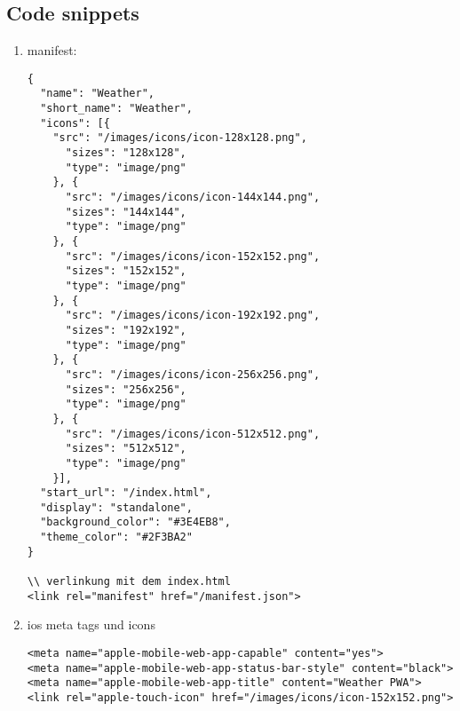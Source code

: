 \documentclass[oneside]{book}%
\begin{document}
\cleardoublepage
{}


\cleardoublepage
\listoftables              %
\cleardoublepage
\listoffigures             %



\cleardoublepage
{}
\begin{appendix}           %

\chapter{Code snippets}

\begin{enumerate}
 
 \item manifest: 
\begin{lstlisting}
{
  "name": "Weather",
  "short_name": "Weather",
  "icons": [{
    "src": "/images/icons/icon-128x128.png",
      "sizes": "128x128",
      "type": "image/png"
    }, {
      "src": "/images/icons/icon-144x144.png",
      "sizes": "144x144",
      "type": "image/png"
    }, {
      "src": "/images/icons/icon-152x152.png",
      "sizes": "152x152",
      "type": "image/png"
    }, {
      "src": "/images/icons/icon-192x192.png",
      "sizes": "192x192",
      "type": "image/png"
    }, {
      "src": "/images/icons/icon-256x256.png",
      "sizes": "256x256",
      "type": "image/png"
    }, {
      "src": "/images/icons/icon-512x512.png",
      "sizes": "512x512",
      "type": "image/png"
    }],
  "start_url": "/index.html",
  "display": "standalone",
  "background_color": "#3E4EB8",
  "theme_color": "#2F3BA2"
}

\\ verlinkung mit dem index.html
<link rel="manifest" href="/manifest.json">
\end{lstlisting}


\item ios meta tags und icons
\begin{lstlisting}
<meta name="apple-mobile-web-app-capable" content="yes">
<meta name="apple-mobile-web-app-status-bar-style" content="black">
<meta name="apple-mobile-web-app-title" content="Weather PWA">
<link rel="apple-touch-icon" href="/images/icons/icon-152x152.png">
\end{lstlisting}


\end{enumerate}
\end{appendix}
\end{document}

